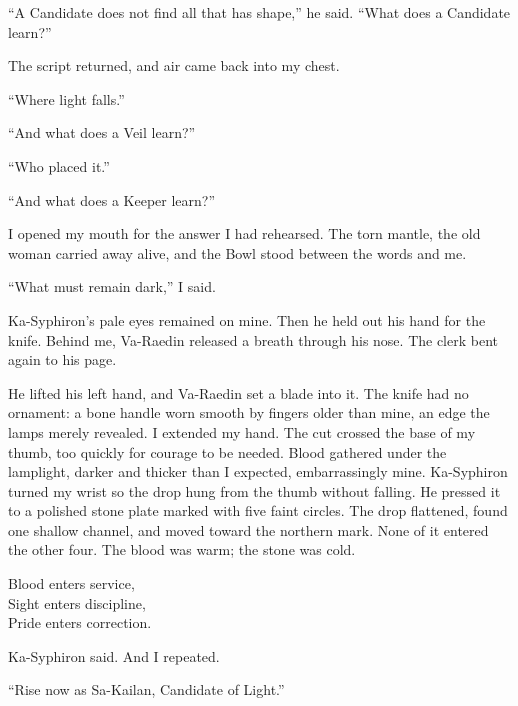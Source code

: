 ``A Candidate does not find all that has shape,'' he said. ``What does a Candidate learn?''\par

The script returned, and air came back into my chest.\par

``Where light falls.''\par
``And what does a Veil learn?''\par
``Who placed it.''\par
``And what does a Keeper learn?''\par

I opened my mouth for the answer I had rehearsed. The torn mantle, the old woman carried away alive, and the Bowl stood between the words and me.\par

``What must remain dark,'' I said.\par

Ka-Syphiron's pale eyes remained on mine. Then he held out his hand for the knife. Behind me, Va-Raedin released a breath through his nose. The clerk bent again to his page.\par

He lifted his left hand, and Va-Raedin set a blade into it. The knife had no ornament: a bone handle worn smooth by fingers older than mine, an edge the lamps merely revealed. I extended my hand. The cut crossed the base of my thumb, too quickly for courage to be needed. Blood gathered under the lamplight, darker and thicker than I expected, embarrassingly mine. Ka-Syphiron turned my wrist so the drop hung from the thumb without falling. He pressed it to a polished stone plate marked with five faint circles. The drop flattened, found one shallow channel, and moved toward the northern mark. None of it entered the other four. The blood was warm; the stone was cold.\par

\begin{scripture}
Blood enters service,\\
Sight enters discipline,\\
Pride enters correction.\\
\end{scripture}

Ka-Syphiron said. And I repeated.\par

``Rise now as Sa-Kailan, Candidate of Light.''\par

